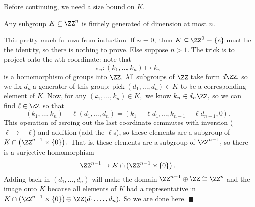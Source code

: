 Before continuing, we need a size bound on $K.$
\begin{lemma}
    Any subgroup $K\subseteq\ZZ^n$ is finitely generated of dimension at most $n.$
\end{lemma}
This pretty much follows from induction. If $n=0,$ then $K\subseteq\ZZ^0=\{e\}$ must be the identity, so there is nothing to prove. Else suppose $n>1.$ The trick is to project onto the $n$th coordinate: note that
\[\pi_n:(k_1,\ldots,k_n)\mapsto k_n\]
is a homomorphism of groups into $\ZZ.$ All subgroups of $\ZZ$ take form $d\ZZ,$ so we fix $d_n$ a generator of this group; pick $(d_1,\ldots,d_n)\in K$ to be a corresponding element of $K.$ Now, for any $(k_1,\ldots,k_n)\in K,$ we know $k_n\in d_n\ZZ,$ so we can find $\ell\in\ZZ$ so that
\[(k_1,\ldots,k_n)-\ell(d_1,\ldots,d_n)=(k_1-\ell d_1,\ldots,k_{n-1}-\ell d_{n-1},0).\]
This operation of zeroing out the last coordinate commutes with inversion ($\ell\mapsto-\ell$) and addition (add the $\ell$s), so these elements are a subgroup of $K\cap\left(\ZZ^{n-1}\times\{0\}\right).$ That is, these elements are a subgroup of $\ZZ^{n-1},$ so there is a surjective homomorphism
\[\ZZ^{n-1}\to K\cap\left(\ZZ^{n-1}\times\{0\}\right).\]
Adding back in $(d_1,\ldots,d_n)$ will make the domain $\ZZ^{n-1}\oplus\ZZ\cong\ZZ^n$ and the image onto $K$ because all elements of $K$ had a representative in $K\cap\left(\ZZ^{n-1}\times\{0\}\right)\oplus\ZZ(d_1,\ldots,d_n).$ So we are done here. $\blacksquare$

